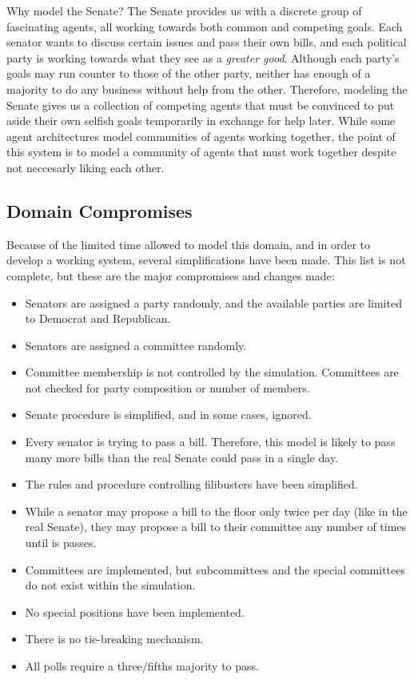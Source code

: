 \documentclass{sig-alternate}
\newenvironment{smallitem}
 {\setlength{\topsep}{0pt}
  \setlength{\partopsep}{0pt}
  \setlength{\parskip}{0pt}
  \begin{itemize}
   \setlength{\leftmargin}{.2in}
  \setlength{\parsep}{0pt}
  \setlength{\parskip}{0pt}
  \setlength{\itemsep}{0pt}}
 {\end{itemize}}
\newcommand{\bi}{\begin{smallitem}}
\newcommand{\ei}{\end{smallitem}}
\begin{document}
Why model the Senate? The Senate provides us with a discrete group of fascinating agents, all working towards both common and competing goals. Each senator wants to discuss certain issues and pass their own bills, and each political party is working towards what they see as a {\em greater good}. Although each party's goals may run counter to those of the other party, neither has enough of a majority to do any business without help from the other. Therefore, modeling the Senate gives us a collection of competing agents that must be convinced to put aside their own selfish goals temporarily in exchange for help later. While some agent architectures model communities of agents working together, the point of this system is to model a community of agents that must work together despite not neccesarly liking each other. 

\subsection{Domain Compromises}

Because of the limited time allowed to model this domain, and in order to develop a working system, several simplifications have been made. This list is not complete, but these are the major compromises and changes made:
\bi
\item Senators are assigned a party randomly, and the available parties are limited to Democrat and Republican.
\item Senators are assigned a committee randomly. 
\item Committee membership is not controlled by the simulation. Committees are not checked for party composition or number of members. 
\item Senate procedure is simplified, and in some cases, ignored. 
\item Every senator is trying to pass a bill. Therefore, this model is likely to pass many more bills than the real Senate could pass in a single day. 
\item The rules and procedure controlling filibusters have been simplified. 
\item While a senator may propose a bill to the floor only twice per day (like in the real Senate), they may propose a bill to their committee any number of times until is passes. 
\item Committees are implemented, but subcommittees and the special committees do not exist within the simulation.
\item No special positions have been implemented. 
\item There is no tie-breaking mechanism. 
\item All polls require a three/fifths majority to pass. 
\ei
\end{document}
